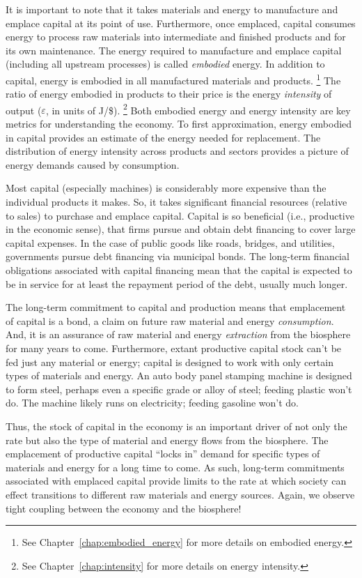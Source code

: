 It is important to note that it takes materials and energy
to manufacture and emplace capital at its point of use.
Furthermore, once emplaced,
capital consumes energy to process raw materials 
into intermediate and finished products
and for its own maintenance.
The energy required to manufacture and emplace capital
(including all upstream processes)
is called \emph{embodied} energy.
In addition to capital, energy is embodied in all manufactured materials and
products.%
	\footnote{
	See Chapter~\ref{chap:embodied_energy} for more details
	on embodied energy.
	}
The ratio of energy embodied in products to their price 
is the energy \emph{intensity} of output ($\varepsilon$, 
in units of J/\$).%
	\footnote{
	See Chapter~\ref{chap:intensity} for more details 
	on energy intensity.
	}
Both embodied energy and energy intensity are key metrics 
for understanding the economy.
To first approximation, energy embodied in capital provides an estimate of the 
energy needed for replacement.
The distribution of energy intensity
across products and sectors
provides a picture of energy demands caused by consumption.

Most capital (especially machines) is considerably more expensive
than the individual products it makes.
So, it takes significant financial resources (relative to sales) 
to purchase and emplace capital.
Capital is so beneficial (i.e., productive in the economic sense), 
that firms pursue and obtain debt financing to cover large capital expenses.
In the case of public goods like roads, bridges, and utilities,
governments pursue debt financing via municipal bonds.
The long-term financial obligations associated with capital financing 
mean that the capital is expected to be in service
for at least the repayment period of the debt,
usually much longer.

The long-term commitment to capital and production means that 
emplacement of capital is a bond, a claim on future
raw material and energy \emph{consumption}.
And, it is an assurance of raw material and energy \emph{extraction} 
from the biosphere for many years to come.
Furthermore, extant productive capital stock can't be fed just any material or energy;
capital is designed to work with only certain types of materials and energy.
An auto body panel stamping machine is designed to form steel, perhaps even a specific 
grade or alloy of steel;
feeding plastic won't do.
The machine likely runs on electricity; 
feeding gasoline won't do.

Thus, the stock of capital in the economy 
is an important driver of not only 
the rate but also  
the type of
material and energy flows from the biosphere.
The emplacement of productive capital
``locks in'' demand for specific types of materials and energy 
for a long time to come.
As such, long-term commitments associated with emplaced capital
provide limits to the rate at which society can effect
transitions to different raw materials and energy sources.
Again, we observe tight coupling between the economy and the biosphere!

